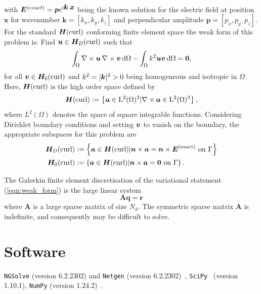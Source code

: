 \documentclass[a4paper,12]{elsarticle}
\theoremstyle{definition}
\renewcommand{\vec}[1]{\mbox{\boldmath$#1$}}
\newcommand{\curl}{\nabla \times}
\begin{document}
with $\boldsymbol{E}^{(exact)} = \vec{p}e^{\rm{i} \vec{k} \cdot \vec{x}}$ being the known solution for the electric field at position $\boldsymbol{x}$ for wavenumber $\boldsymbol{k} = \left[k_x, k_y, k_z\right]$ and perpendicular amplitude $\boldsymbol{p} = \left[p_x, p_y, p_z\right]$. For the standard $\boldsymbol{H}(\rm{curl})$ conforming finite element space \cite{Monk2017} the weak form of this problem is: Find $\boldsymbol{u} \in \boldsymbol{H}_D(\rm{curl})$ such that
\begin{equation}\label{eqn:weak_form}
\int_\Omega \curl \vec{u} \, \curl \vec{v} \,\mathrm{d}\Omega - \int_\Omega k^2 \vec{u}\vec{v} \,\mathrm{d}\Omega = \vec{0},
\end{equation}
for all $\vec{v} \in \boldsymbol{H}_0(\rm{curl})$ and $k^2 = |\vec{k}|^2 > 0$ being homogeneous and isotropic in $\Omega$. Here, $\boldsymbol{H}(\rm{curl})$ is the high order space defined by
\begin{equation*}
\boldsymbol{H}(\rm{curl}) := \left\{ \vec{a} \in L^2(\Omega)^3 | \curl \vec{a} \in L^2(\Omega)^3\right\},
\end{equation*}
where $L^2(\Omega)$ denotes the space of square integrable functions. Considering Dirichlet boundary conditions and setting $\vec{v}$ to vanish on the boundary, the appropriate subspaces for this problem are
\begin{equation*}
\begin{alignedat}{2}
\boldsymbol{H}_D(\rm{curl}) &:= \left\{ \vec{a} \in \vec{H}(\rm{curl}) | \vec{n}\times \vec{a} = \vec{n} \times \vec{E}^{(exact)} \text{ on } \Gamma\right\}\\
\boldsymbol{H}_0(\rm{curl}) &:= \left\{ \vec{a} \in \vec{H}(\rm{curl}) | \vec{n}\times \vec{a} = \vec{0} \text{ on } \Gamma\right\}.
\end{alignedat}
\end{equation*}

The Galerkin finite element discretisation of the variational statement (\ref{eqn:weak_form}) is the large linear system
\begin{equation}\label{eqn:lse}
\mathbf{A}\mathbf{q} = \mathbf{r}
\end{equation}
where $\mathbf{A}$ is a large sparse matrix of size $N_d$. The symmetric sparse matrix $\mathbf{A}$ is indefinite, and consequently may be difficult to solve.
\section{Software}
\texttt{NGSolve} (version 6.2.2302) and \texttt{Netgen} (version 6.2.2302)~\cite{NGSolve,zaglmayrphd,netgendet}, \texttt{SciPy}~\cite{2020SciPy-NMeth} (version 1.10.1), \texttt{NumPy} (version 1.24.2)~\cite{harris2020array}.
\end{document}
